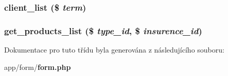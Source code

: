 \subsubsection[{client\_\-list}]{\setlength{\rightskip}{0pt plus 5cm}client\_\-list (\$ {\em term})}\label{dc/d05/classform__autocomplete_abc20c16e5558c5dba560e585045d917f}
\subsubsection[{get\_\-products\_\-list}]{\setlength{\rightskip}{0pt plus 5cm}get\_\-products\_\-list (\$ {\em type\_\-id}, \/  \$ {\em insurence\_\-id})}\label{dc/d05/classform__autocomplete_a6243f1b640201fd404bb6535c448b239}


Dokumentace pro tuto třídu byla generována z následujícího souboru:\begin{DoxyCompactItemize}
\item 
app/form/{\bf form.php}\end{DoxyCompactItemize}
